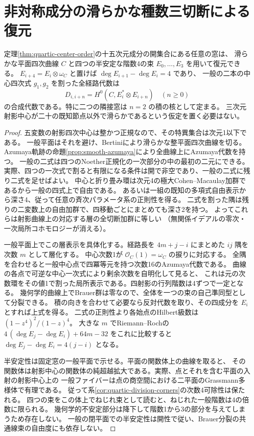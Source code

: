 \section{非対称成分の滑らかな種数三切断による復元}
\label{sec:finite-genus-three-curve-cut}
\begin{theorem}\label{thm:finite-genus-three-curve-cut}
定理\ref{thm:quartic-center-order}の十五次元成分の開集合にある任意の窓は、
滑らかな平面四次曲線 $C$ と四つの半安定な階数4の束 $E_0,\ldots,E_3$ を用いて復元できる。
$E_{i+4}=E_i\otimes\omega_C$ と置けば $\deg E_{i+1}-\deg E_i=4$ であり、
一般の二本の中心四次式 $g_1,g_2$ を割った全経路代数は
\[
 D_{i,i+n}=H^0(C,E_i^*\otimes E_{i+n})\quad(n\ge0)
\]
の合成代数である。特に二つの隣接窓は $n=2$ の積の核として定まる。
三次元射影中心が二十の既知節点以外で滑らかであるという仮定を置く必要はない。
\end{theorem}
\begin{proof}
五変数の射影四次中心は整かつ正規なので、その特異集合は次元1以下である。
一般平面はそれを避け、Bertiniにより滑らかな整平面四次曲線を切る。
Azumaya軌跡の命題\ref{prop:smooth-azumaya}により全曲線上にAzumaya代数を持つ。
一般の二式は四つのNoether正規化の一次部分の中の最初の二元にできる。
実際、四つの一次式で割ると有限になる条件は開で非空であり、一般の二式に残り二式を足せばよい。
中心と折り畳み環は次元4の極大Cohen--Macaulay加群であるから一般の四式上で自由である。
あるいは一組の既知の多項式自由表示から深さ4、従って任意の斉次パラメータ系の正則性を得る。
二式を割った隅は残りの二変数上の自由加群で、四移動ごとにまとめても深さ2を持つ。
よってこれらは射影曲線上の対応する層の全切断加群に等しい
（無関係イデアルの零次・一次局所コホモロジーが消える）。

一般平面上でこの層表示を具体化する。経路長を $4m+j-i$ にまとめた $ij$ 隅を次数 $m$ として層化する。
中心次数1が $\mathcal O_C(1)=\omega_C$ の捩りに対応する。
全隅を合わせると一般中心点で四冪等元を持つ次数16のAzumaya代数である。
曲線の各点で可逆な中心一次式により剰余次数を自明化して見ると、
これは元の次数環をその値1で割った局所表示である。四射影の行列階数は4ずつで一定となる。
幾何学的曲線上でBrauer群は零なので、全体を一つの束の自己準同型として分裂できる。
積の向きを合わせて必要なら反対代数を取り、その四成分を $E_i$ とすれば上式を得る。
二式の正則性より各始点のHilbert級数は $(1-z^4)^2/(1-z)^4$。
大きな $m$ でRiemann--Rochの $4\,(\deg E_j-\deg E_i)+64m-32$
をこれに比較すると $\deg E_j-\deg E_i=4(j-i)$ となる。

半安定性は固定窓の一般平面で示せる。平面の関数体上の曲線を取ると、
その関数体は射影中心の関数体の純超越拡大である。実際、点とそれを含む平面の入射の射影中心上の
一般ファイバーは点の商空間における二平面のGrassmann多様体で有理である。
従って系\ref{cor:quartic-division-corners}の次数4可除性は保たれる。
四つの束をこの体上でねじれ束として読むと、ねじれた一般階数は4の倍数に限られる。
幾何学的不安定部分は降下して階数1から3の部分を与えてしまうため存在しない。
一般の閉平面での半安定性は開性で従い、Brauer分裂の共通線束の自由度にも依存しない。
\end{proof}

